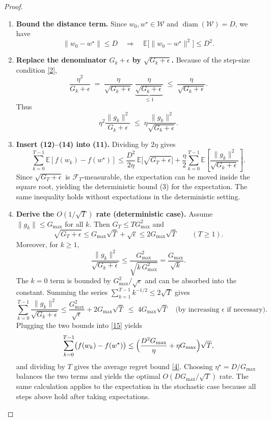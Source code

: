 \documentclass[11pt]{article}
\newcommand{\E}{\mathbb{E}}
\begin{document}
\begin{proof}
\begin{enumerate}
\item[Step 7.] \textbf{Bound the distance term.}
Since $w_0,w^{\star}\in\mathcal{W}$ and $\operatorname{diam}(\mathcal{W})=D$, we have
\[
\|w_0-w^{\star}\|\le D\quad\Longrightarrow\quad
\E\!\bigl[\|w_0-w^{\star}\|^{2}\bigr]\le D^{2}.
\tag{12}
\]

\item[Step 8.] \textbf{Replace the denominator $G_k+\epsilon$ by $\sqrt{G_k+\epsilon}$.}
Because of the step‑size condition \eqref{2},
\[
\frac{\eta^{2}}{G_k+\epsilon}
\;=\;
\frac{\eta}{\sqrt{G_k+\epsilon}}\;\underbrace{\frac{\eta}{\sqrt{G_k+\epsilon}}}_{\le 1}
\;\le\;
\frac{\eta}{\sqrt{G_k+\epsilon}} .
\tag{13}
\]
Thus
\[
\eta^{2}\frac{\|g_k\|^{2}}{G_k+\epsilon}
\;\le\;
\eta\frac{\|g_k\|^{2}}{\sqrt{G_k+\epsilon}} .
\tag{14}
\]

\item[Step 9.] \textbf{Insert (12)–(14) into (11).}
Dividing by $2\eta$ gives
\[
\sum_{k=0}^{T-1}\E\!\left[f(w_k)-f(w^{\star})\right]
\le
\frac{D^{2}}{2\eta}\,\E\!\bigl[\sqrt{G_T+\epsilon}\bigr]
+\frac{\eta}{2}\sum_{k=0}^{T-1}\E\!\left[\frac{\|g_k\|^{2}}{\sqrt{G_k+\epsilon}}\right].
\tag{15}
\]
Since $\sqrt{G_T+\epsilon}$ is $\mathcal{F}_T$‑measurable, the expectation can be moved inside the square root, yielding the deterministic bound (3) for the expectation.  The same inequality holds without expectations in the deterministic setting.

\item[Step 10.] \textbf{Derive the $O(1/\sqrt{T})$ rate (deterministic case).}
Assume $\|g_k\|\le G_{\max}$ for all $k$. Then $G_T\le TG_{\max}^{2}$ and
\[
\sqrt{G_T+\epsilon}\le G_{\max}\sqrt{T}+ \sqrt{\epsilon}\le 2G_{\max}\sqrt{T}\qquad(T\ge1).
\]
Moreover, for $k\ge1$,
\[
\frac{\|g_k\|^{2}}{\sqrt{G_k+\epsilon}}
\le
\frac{G_{\max}^{2}}{\sqrt{k\,G_{\max}^{2}}}
= \frac{G_{\max}}{\sqrt{k}} .
\]
The $k=0$ term is bounded by $G_{\max}^{2}/\sqrt{\epsilon}$ and can be absorbed into the constant.
Summing the series $\sum_{k=1}^{T-1}k^{-1/2}\le 2\sqrt{T}$ gives
\[
\sum_{k=0}^{T-1}\frac{\|g_k\|^{2}}{\sqrt{G_k+\epsilon}}
\le
\frac{G_{\max}^{2}}{\sqrt{\epsilon}}+2G_{\max}\sqrt{T}
\;\le\;
4G_{\max}\sqrt{T}
\quad\text{(by increasing $\epsilon$ if necessary).}
\]
Plugging the two bounds into \eqref{15} yields
\[
\sum_{k=0}^{T-1}\bigl(f(w_k)-f(w^{\star})\bigr)
\le
\Bigl(\frac{D^{2}G_{\max}}{\eta}+\eta G_{\max}\Bigr)\sqrt{T},
\]
and dividing by $T$ gives the average regret bound \eqref{4}.  Choosing
$\eta^{\star}=D/G_{\max}$ balances the two terms and yields the optimal
$O(DG_{\max}/\sqrt{T})$ rate.  The same calculation applies to the
expectation in the stochastic case because all steps above hold after
taking expectations.
\end{enumerate}
\end{proof}
\end{document}
